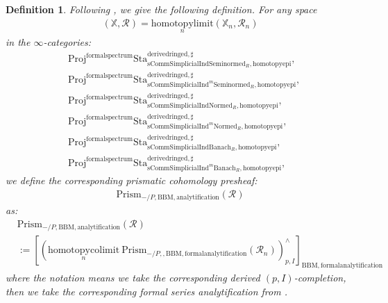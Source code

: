 \documentclass[12pt]{book}
\newtheorem{definition}{Definition}
\begin{document}
\begin{definition}
Following \cite[Construction 7.6]{BS}, \cite[Definition 3.1, Variant 5.1]{BL} we give the following definition. For any space
\begin{align}
(\mathbb{X},\mathcal{R})=\underset{n}{\mathrm{homotopylimit}}(\mathbb{X}_n,\mathcal{R}_n)	
\end{align}
in the $\infty$-categories:
\begin{align}
&\mathrm{Proj}^\mathrm{formalspectrum}\mathrm{Sta}^\mathrm{derivedringed,\sharp}_{\mathrm{sComm}\mathrm{Simplicial}\mathrm{Ind}\mathrm{Seminormed}_R,\mathrm{homotopyepi}},\\
&\mathrm{Proj}^\mathrm{formalspectrum}\mathrm{Sta}^\mathrm{derivedringed,\sharp}_{\mathrm{sComm}\mathrm{Simplicial}\mathrm{Ind}^m\mathrm{Seminormed}_R,\mathrm{homotopyepi}},\\
&\mathrm{Proj}^\mathrm{formalspectrum}\mathrm{Sta}^\mathrm{derivedringed,\sharp}_{\mathrm{sComm}\mathrm{Simplicial}\mathrm{Ind}\mathrm{Normed}_R,\mathrm{homotopyepi}},\\
&\mathrm{Proj}^\mathrm{formalspectrum}\mathrm{Sta}^\mathrm{derivedringed,\sharp}_{\mathrm{sComm}\mathrm{Simplicial}\mathrm{Ind}^m\mathrm{Normed}_R,\mathrm{homotopyepi}},\\
&\mathrm{Proj}^\mathrm{formalspectrum}\mathrm{Sta}^\mathrm{derivedringed,\sharp}_{\mathrm{sComm}\mathrm{Simplicial}\mathrm{Ind}\mathrm{Banach}_R,\mathrm{homotopyepi}},\\
&\mathrm{Proj}^\mathrm{formalspectrum}\mathrm{Sta}^\mathrm{derivedringed,\sharp}_{\mathrm{sComm}\mathrm{Simplicial}\mathrm{Ind}^m\mathrm{Banach}_R,\mathrm{homotopyepi}},	
\end{align}
we define the corresponding prismatic cohomology presheaf:
\begin{align}
\mathrm{Prism}_{-/P,\mathrm{BBM},\mathrm{analytification}}(\mathcal{R})
\end{align}
as:
\begin{align}
&\mathrm{Prism}_{-/P,\mathrm{BBM},\mathrm{analytification}}(\mathcal{R})\\
&:=[(\underset{n}{\mathrm{homotopycolimit}}~ \mathrm{Prism}_{-/P,,\mathrm{BBM},\mathrm{formalanalytification}}(\mathcal{R}_n))^\wedge_{p,I}]_{\mathrm{BBM},\mathrm{formalanalytification}}	
\end{align}
where the notation means we take the corresponding derived $(p,I)$-completion, then we take the corresponding formal series analytification from \cite[4.2]{BBM}.\\

\end{definition}
\end{document}
